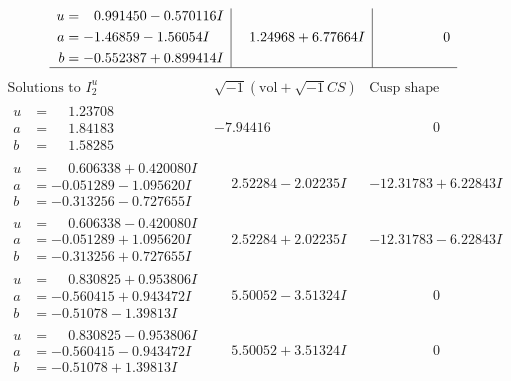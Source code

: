 \documentclass[1p]{elsarticle_modified}
\theoremstyle{definition}
\newcommand{\I}{\sqrt{-1}}
\begin{document}
$$\begin{array}{c|c|c}
\begin{aligned}
u &= \phantom{-}0.991450 - 0.570116 I \\
a &= -1.46859 - 1.56054 I \\
b &= -0.552387 + 0.899414 I\end{aligned}
 & \phantom{-}1.24968 + 6.77664 I & \phantom{-0.000000 } 0\\
 \hline 
 \end{array}$$\newpage$$\begin{array}{c|c|c}  
\text{Solutions to }I^u_{2}& \I (\text{vol} + \sqrt{-1}CS) & \text{Cusp shape}\\
 \hline 
\begin{aligned}
u &= \phantom{-}1.23708\phantom{ +0.000000I} \\
a &= \phantom{-}1.84183\phantom{ +0.000000I} \\
b &= \phantom{-}1.58285\phantom{ +0.000000I}\end{aligned}
 & -7.94416\phantom{ +0.000000I} & \phantom{-0.000000 } 0 \\ \hline\begin{aligned}
u &= \phantom{-}0.606338 + 0.420080 I \\
a &= -0.051289 - 1.095620 I \\
b &= -0.313256 - 0.727655 I\end{aligned}
 & \phantom{-}2.52284 - 2.02235 I & -12.31783 + 6.22843 I \\ \hline\begin{aligned}
u &= \phantom{-}0.606338 - 0.420080 I \\
a &= -0.051289 + 1.095620 I \\
b &= -0.313256 + 0.727655 I\end{aligned}
 & \phantom{-}2.52284 + 2.02235 I & -12.31783 - 6.22843 I \\ \hline\begin{aligned}
u &= \phantom{-}0.830825 + 0.953806 I \\
a &= -0.560415 + 0.943472 I \\
b &= -0.51078 - 1.39813 I\end{aligned}
 & \phantom{-}5.50052 - 3.51324 I & \phantom{-0.000000 } 0 \\ \hline\begin{aligned}
u &= \phantom{-}0.830825 - 0.953806 I \\
a &= -0.560415 - 0.943472 I \\
b &= -0.51078 + 1.39813 I\end{aligned}
 & \phantom{-}5.50052 + 3.51324 I & \phantom{-0.000000 } 0 \\ \hline\begin{aligned}

\end{aligned}
\end{array}$$
\end{document}
